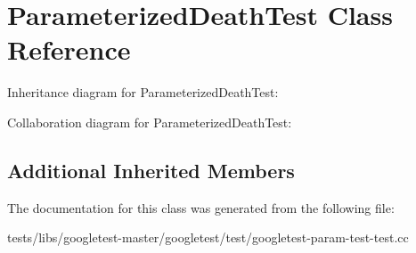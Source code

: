 \hypertarget{classParameterizedDeathTest}{}\section{Parameterized\+Death\+Test Class Reference}
\label{classParameterizedDeathTest}


Inheritance diagram for Parameterized\+Death\+Test\+:


Collaboration diagram for Parameterized\+Death\+Test\+:
\subsection*{Additional Inherited Members}


The documentation for this class was generated from the following file\+:\begin{DoxyCompactItemize}
\item 
tests/libs/googletest-\/master/googletest/test/googletest-\/param-\/test-\/test.\+cc\end{DoxyCompactItemize}
